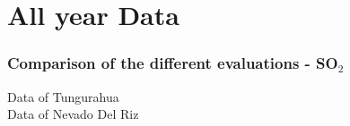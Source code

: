 \documentclass[aspectratio=169]{beamer} %
\begin{document}
		\section{All year Data}
		\begin{frame}
			\frametitle{\color{mygreen}Comparison of the different evaluations - SO$_2$\\%
				\color{mygreen}{\rule{0.8\textwidth}{2pt}}}
			\begin{figure}[h!]	
			\end{figure}
			\vspace{-0.7cm}
	\begin{multicols}{2}
		\centering
		Data of Tungurahua\\
		Data of Nevado Del Riz
	\end{multicols}
		\end{frame}
		
\end{document}
